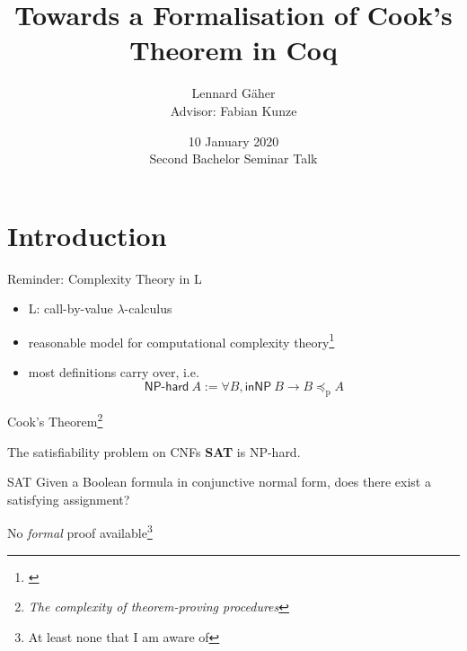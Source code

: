\documentclass[11pt,usenames,dvipsnames,
hyperref={pdfencoding=auto,psdextra}]{beamer}
\title{Towards a Formalisation of Cook's Theorem in Coq}
\institute{Saarland University}
\date{10 January 2020\\[1ex]Second Bachelor Seminar Talk}
\author{Lennard Gäher\\[1mm] {\small{Advisor: Fabian Kunze}}}
\let\otp\titlepage
\renewcommand{\titlepage}{\otp\addtocounter{framenumber}{-1}}
\newcommand*{\sat}{\textbf{SAT}}
\begin{document}
\begin{frame}[plain]
  \titlepage
\end{frame}

\section{Introduction}

\begin{frame}{Reminder: Complexity Theory in L}
  \begin{itemize}
    \item L: call-by-value $\lambda$-calculus
    \item reasonable model for computational complexity theory\footnote{\cite{ForsterKunzeRoth:2019:wcbv-Reasonable}}
    \item most definitions carry over, i.e. 
      \[
        \textsf{NP-hard}~A := \forall B, \textsf{inNP}~B \rightarrow B \preceq_{\text{p}} A 
      \]
  \end{itemize}
\end{frame}

\begin{frame}{Cook's Theorem\footnote{\emph{The complexity of theorem-proving procedures}\cite{Cook:1971:CTP:800157.805047}}}

  \begin{block}{\vspace*{-3ex}}
    The satisfiability problem on CNFs \sat{} is NP-hard.
  \end{block}
  \vspace{3ex}
  \begin{block}{SAT}
    Given a Boolean formula in conjunctive normal form, does there exist a satisfying assignment?
  \end{block}

  \vspace{3ex}
  \begin{center}
    No \emph{formal} proof available\footnote{At least none that I am aware of}
  \end{center}
\end{frame}
\end{document}
